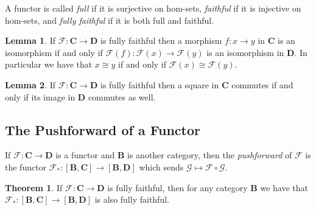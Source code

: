 \documentclass[oneside,11pt]{amsart}
\newcommand{\bB}{\ensuremath{\textbf{B}}}
\newcommand{\bC}{\ensuremath{\textbf{C}}}
\newcommand{\bD}{\ensuremath{\textbf{D}}}
\newcommand{\mF}{\ensuremath{\mathcal{F}}}
\newcommand{\mG}{\ensuremath{\mathcal{G}}}
\theoremstyle{definition}
\newtheorem{proof techniques}{Proof Techniques}
\newtheorem{lemma}{Lemma}
\newtheorem{theorem}{Theorem}
\begin{document}
A functor is called \emph{full} if it is surjective on hom-sets, \emph{faithful} if it is injective on hom-sets, and \emph{fully faithful} if it is both full and faithful. 

\begin{lemma}\label{lem: objects are isomorphic iff their images under a fully faithful functor are isomorphic}
If $\mF : \bC \to \bD$ is fully faithful then a morphism $f  : x \to y$ in $\bC$ is an isomorphism if and only if $\mF(f) : \mF(x) \to \mF(y)$ is an isomorphism in $\bD$. In particular we have that $x \cong y$ if and only if $\mF(x) \cong \mF(y)$. 
\end{lemma}


\begin{lemma}\label{lem: fully faithful functors preserve and reflect commutative squares}
If $\mF : \bC \to \bD$ is fully faithful then a square in $\bC$ commutes if and only if its image in $\bD$ commutes as well. 
\end{lemma}


\subsection{The Pushforward of a Functor}

If $\mF : \bC \to \bD$ is a functor and $\bB$ is another category, then the \emph{pushforward} of $\mF$ is the functor $\mF_* : [\bB , \bC] \to [\bB , \bD]$ which sends $\mG \mapsto \mF \circ \mG$. 

\begin{theorem} \label{thm: pushforwards of fully faithful functors are also fully faithful}
If $\mF: \bC \to \bD$ is fully faithful, then for any category $\bB$ we have that $\mF_* : [\bB , \bC] \to [\bB , \bD]$ is also fully faithful. 
\end{theorem}
\end{document}
